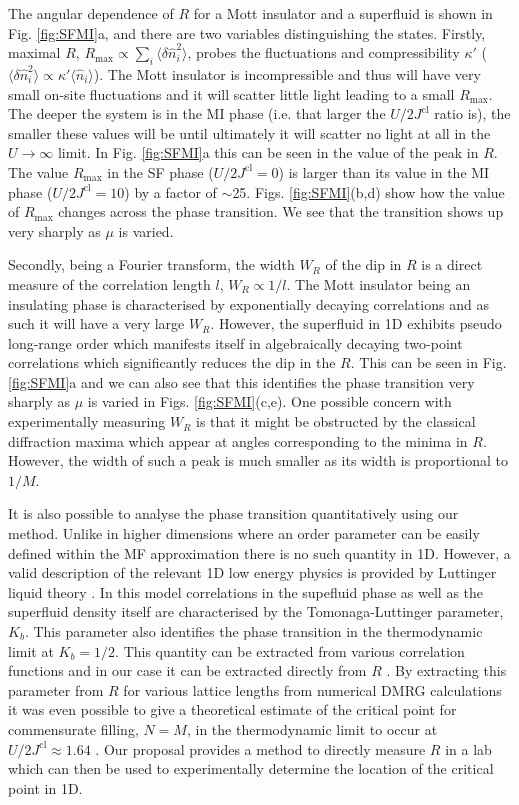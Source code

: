 The angular dependence of $R$ for a Mott insulator and a superfluid is
shown in Fig. \ref{fig:SFMI}a, and there are two variables
distinguishing the states. Firstly, maximal $R$,
$R_\text{max} \propto \sum_i \langle \delta \hat{n}_i^2 \rangle$,
probes the fluctuations and compressibility $\kappa'$
($\langle \delta \hat{n}^2_i \rangle \propto \kappa' \langle \hat{n}_i
\rangle$).  The Mott insulator is incompressible and thus will have
very small on-site fluctuations and it will scatter little light
leading to a small $R_\text{max}$. The deeper the system is in the MI
phase (i.e. that larger the $U/2J^\text{cl}$ ratio is), the smaller
these values will be until ultimately it will scatter no light at all
in the $U \rightarrow \infty$ limit. In Fig. \ref{fig:SFMI}a this can
be seen in the value of the peak in $R$. The value $R_\text{max}$ in
the SF phase ($U/2J^\text{cl} = 0$) is larger than its value in the MI
phase ($U/2J^\text{cl} = 10$) by a factor of
$\sim$25. Figs. \ref{fig:SFMI}(b,d) show how the value of
$R_\text{max}$ changes across the phase transition. We see that the
transition shows up very sharply as $\mu$ is varied.

Secondly, being a Fourier transform, the width $W_R$ of the dip in $R$
is a direct measure of the correlation length $l$, $W_R \propto
1/l$. The Mott insulator being an insulating phase is characterised by
exponentially decaying correlations and as such it will have a very
large $W_R$. However, the superfluid in 1D exhibits pseudo long-range
order which manifests itself in algebraically decaying two-point
correlations \cite{giamarchi} which significantly reduces the dip in
the $R$. This can be seen in Fig. \ref{fig:SFMI}a and we can also see
that this identifies the phase transition very sharply as $\mu$ is
varied in Figs. \ref{fig:SFMI}(c,e). One possible concern with
experimentally measuring $W_R$ is that it might be obstructed by the
classical diffraction maxima which appear at angles corresponding to
the minima in $R$. However, the width of such a peak is much smaller
as its width is proportional to $1/M$.

It is also possible to analyse the phase transition quantitatively
using our method. Unlike in higher dimensions where an order parameter
can be easily defined within the MF approximation there is no such
quantity in 1D. However, a valid description of the relevant 1D low
energy physics is provided by Luttinger liquid theory
\cite{giamarchi}. In this model correlations in the supefluid phase as
well as the superfluid density itself are characterised by the
Tomonaga-Luttinger parameter, $K_b$. This parameter also identifies
the phase transition in the thermodynamic limit at $K_b = 1/2$. This
quantity can be extracted from various correlation functions and in
our case it can be extracted directly from $R$ \cite{ejima2011}. By
extracting this parameter from $R$ for various lattice lengths from
numerical DMRG calculations it was even possible to give a theoretical
estimate of the critical point for commensurate filling, $N = M$, in
the thermodynamic limit to occur at $U/2J^\text{cl} \approx 1.64$
\cite{ejima2011}. Our proposal provides a method to directly measure
$R$ in a lab which can then be used to experimentally determine the
location of the critical point in 1D.

